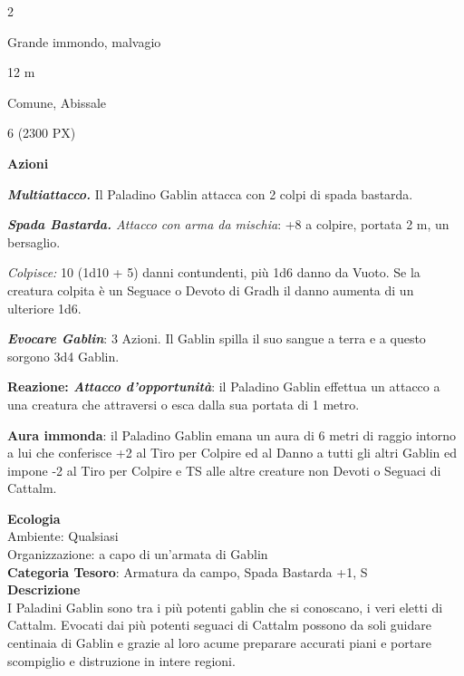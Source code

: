 \begin{multicols}{2}
{
\begin{description}[noitemsep, topsep=0pt, parsep=0pt, partopsep=0pt, itemsep=1pt, leftmargin=2.35cm,  labelwidth=2.2cm, itemindent=0cm, listparindent=0pt] %
\setlength{\baselineskip}{10pt}
\item[\textbf{Taglia/Tipo}] Grande immondo, malvagio
\item[\textbf{Caratt.}] 
\item[\textbf{Punti Ferita}] 
\item[\textbf{Movimento}] 12 m
\item[\textbf{Tiri Salvez.}] 
\item[\textbf{Sensi}] 
\item[\textbf{Linguaggi}] Comune, Abissale
\item[\textbf{Sfida}] 6 (2300 PX)
\end{description}
\smallskip

\textbf{Azioni}

\emph{\textbf{Multiattacco.}} Il Paladino Gablin attacca con 2 colpi di spada bastarda.

\emph{\textbf{Spada Bastarda.} Attacco con arma da mischia}: +8 a colpire, portata 2 m, un bersaglio.

\emph{Colpisce:} 10 (1d10 + 5) danni contundenti, più 1d6 danno da Vuoto. Se la creatura colpita è un Seguace o Devoto di Gradh il danno aumenta di un ulteriore 1d6.

\emph{\textbf{Evocare Gablin}}: 3 Azioni. Il Gablin spilla il suo sangue a terra e a questo sorgono 3d4 Gablin.

\textbf{Reazione: \emph{Attacco d'opportunità}}: il Paladino Gablin effettua un attacco a una creatura che attraversi o esca dalla sua portata di 1 metro.

\textbf{Aura immonda}: il Paladino Gablin emana un aura di 6 metri di raggio intorno a lui che conferisce +2 al Tiro per Colpire ed al Danno a tutti gli altri Gablin ed impone -2 al Tiro per Colpire e TS alle altre creature non Devoti o Seguaci di Cattalm.

\textbf{Ecologia}\\
Ambiente: Qualsiasi\\
Organizzazione: a capo di un'armata di Gablin\\
\textbf{Categoria Tesoro}: Armatura da campo, Spada Bastarda +1, S\\
\textbf{Descrizione}\\
I Paladini Gablin sono tra i più potenti gablin che si conoscano, i veri eletti di Cattalm. Evocati dai più potenti seguaci di Cattalm possono da soli guidare centinaia di Gablin e grazie al loro acume preparare accurati piani e portare scompiglio e distruzione in intere regioni.

}
\end{multicols}
